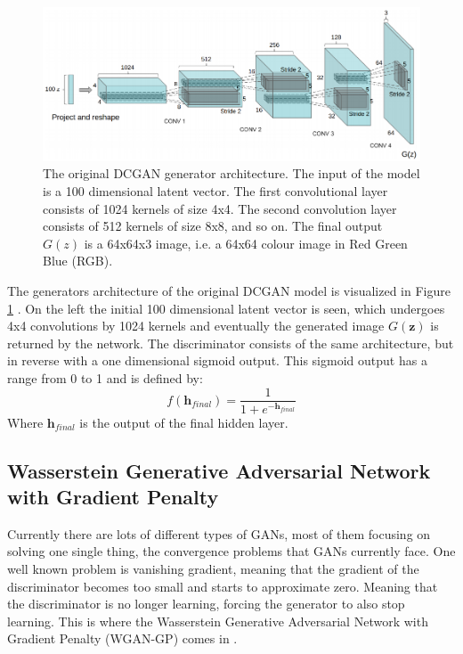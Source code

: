 \begin{figure} [!htb]
    \centering
    \includegraphics[scale=0.5]{figuren/fig5.png}
    \caption{The original DCGAN generator architecture. The input of the model is a 100 dimensional latent vector. The first convolutional layer consists of 1024 kernels of size 4x4. The second convolution layer consists of 512 kernels of size 8x8, and so on. The final output $G(z)$ is a 64x64x3 image, i.e. a 64x64 colour image in Red Green Blue (RGB).}
    \label{fig:dcganarch}
\end{figure}

The generators architecture of the original DCGAN model is visualized in Figure \ref{fig:dcganarch} . On the left the initial 100 dimensional latent vector is seen, which undergoes 4x4 convolutions by 1024 kernels and eventually the generated image $G(\boldsymbol{z})$ is returned by the network. The discriminator consists of the same architecture, but in reverse with a one dimensional sigmoid output. This sigmoid output has a range from 0 to 1 and is defined by:
\begin{equation}
    f(\boldsymbol{h}_{final}) = \frac{1}{1+e^{-\boldsymbol{h}_{final}}}
    \label{eq:mapping}
\end{equation}
Where $\boldsymbol{h}_{final}$ is the output of the final hidden layer.




\subsection{Wasserstein Generative Adversarial Network with Gradient Penalty}
Currently there are lots of different types of GANs, most of them focusing on solving one single thing, the convergence problems that GANs currently face. One well known problem is vanishing gradient, meaning that the gradient of the discriminator becomes too small and starts to approximate zero. Meaning that the discriminator is no longer learning, forcing the generator to also stop learning. This is where the Wasserstein Generative Adversarial Network with Gradient Penalty (WGAN-GP) comes in \cite{gulrajani2017improved}. 


